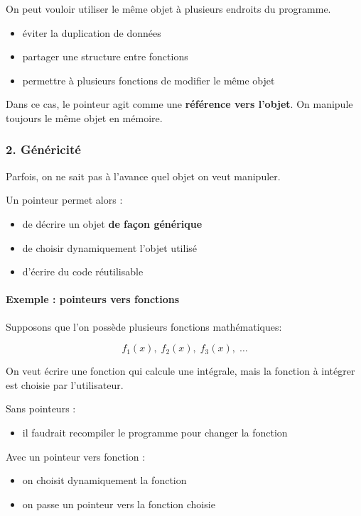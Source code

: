 On peut vouloir utiliser le même objet à plusieurs endroits du programme.

\begin{itemize}
    \item éviter la duplication de données
    \item partager une structure entre fonctions
    \item permettre à plusieurs fonctions de modifier le même objet
\end{itemize}

Dans ce cas, le pointeur agit comme une \textbf{référence vers l’objet}.
On manipule toujours le même objet en mémoire.

\subsubsection{2. Généricité}

Parfois, on ne sait pas à l’avance quel objet on veut manipuler.

Un pointeur permet alors :

\begin{itemize}
    \item de décrire un objet \textbf{de façon générique}
    \item de choisir dynamiquement l’objet utilisé
    \item d’écrire du code réutilisable
\end{itemize}

\paragraph{Exemple : pointeurs vers fonctions}
Supposons que l’on possède plusieurs fonctions mathématiques:

\[
f_1(x),\; f_2(x),\; f_3(x),\; \dots
\]

On veut écrire une fonction qui calcule une intégrale,
mais la fonction à intégrer est choisie par l’utilisateur.

Sans pointeurs :

\begin{itemize}
    \item il faudrait recompiler le programme pour changer la fonction
\end{itemize}

Avec un pointeur vers fonction :

\begin{itemize}
    \item on choisit dynamiquement la fonction
    \item on passe un pointeur vers la fonction choisie
\end{itemize}

